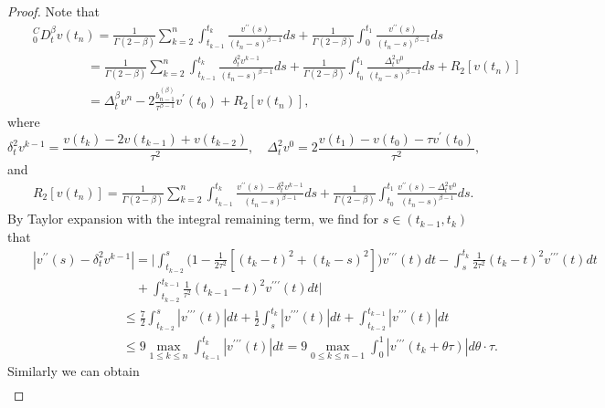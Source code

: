 \documentclass[11pt]{article}
\newenvironment{proofed}{\begin{proof}}{\end{proof}}
\begin{document}
\begin{proofed}
Note that
\begin{eqnarray}
&&_0^CD_t^{\beta}v(t_n)=\frac{1}{\Gamma{(2-\beta)} } \sum_{k=2}^n \int_{t_{k-1}}^{t_k} \frac{v^{\prime\prime}(s)}{(t_n-s)^{\beta-1}}ds +\frac{1}{\Gamma{(2-\beta)} } \int_{0}^{t_1} \frac{v^{\prime\prime}(s)}{(t_n-s)^{\beta-1}}ds\nonumber \\
&&   \qquad \qquad ~ = \frac{1}{\Gamma{(2-\beta)} } \sum_{k=2}^n \int_{t_{k-1}}^{t_k} \frac{\delta_t^2 v^{k-1}}{(t_n-s)^{\beta-1}}ds +\frac{1}{\Gamma{(2-\beta)} } \int_{t_{0}}^{t_1} \frac{\Delta_t^2v^{0}}{(t_n-s)^{\beta-1}}ds+R_2[v(t_n)] \nonumber \\
&&   \qquad \qquad~=\Delta_t^{\beta}v^n- 2  \frac{b_{n-1}^{(\beta)}}{\tau^{\beta-1}}  v^{\prime}(t_0)  +R_2[v(t_n)], \label{split-1}
\end{eqnarray}
where
$$\delta_t^2v^{k-1}=\frac{v(t_k)-2v(t_{k-1})+v(t_{k-2}) }{\tau^2},\quad \Delta_t^2v^{0}=2\frac{v(t_1)-v(t_{0})-\tau v^{\prime}(t_{0}) }{\tau^2},$$
and
\begin{eqnarray}
&&R_2[v(t_n)]= \frac{1}{\Gamma{(2-\beta)} } \sum_{k=2}^n \int_{t_{k-1}}^{t_k} \frac{v^{\prime\prime}(s)-\delta_t^2 v^{k-1}}{(t_n-s)^{\beta-1}}ds  +\frac{1}{\Gamma{(2-\beta)} }  \int_{t_{0}}^{t_1} \frac{v^{\prime\prime}(s)-\Delta_t^2 v^{0}}{(t_n-s)^{\beta-1}}ds. \label{truncation}
\end{eqnarray}
By  Taylor expansion with the integral remaining term,  we find for $s\in(t_{k-1},t_{k})$ that
\begin{eqnarray}
&& |v^{\prime\prime}(s)-\delta_t^2 v^{k-1}| = \biggl|\int^s_{t_{k-2}}\biggl(1-\frac{1}{2\tau^2}[(t_k-t)^2+(t_k-s)^2]\biggl) v^{\prime\prime\prime}(t)dt-\int_s^{t_{k}}\frac{1}{2\tau^2}(t_{k}-t)^2 v^{\prime\prime\prime}(t)dt\nonumber\\
&&\qquad\qquad\qquad\qquad +\int_{t_{k-2}}^{t_{k-1}}\frac{1}{\tau^2}(t_{k-1}-t)^2 v^{\prime\prime\prime}(t)dt \biggl|\nonumber\\
&& \qquad \qquad\qquad\quad \leq \frac{7}{2}\int^s_{t_{k-2}} |v^{\prime\prime\prime}(t)|dt+\frac{1}{2}\int_s^{t_{k}} |v^{\prime\prime\prime}(t)|dt+\int_{t_{k-2}}^{t_{k-1}} |v^{\prime\prime\prime}(t)|dt\nonumber\\
&& \qquad \qquad\qquad\quad \leq 9\max_{1\leq k\leq n}\int_{t_{k-1}}^{t_{k}} |v^{\prime\prime\prime}(t)|dt =9 \max_{0\leq k\leq n-1}\int_{0}^{1}|v^{\prime\prime\prime}(t_{k}+\theta \tau)|d\theta\cdot \tau . \label{truncation-1}
\end{eqnarray}
Similarly we can obtain
\begin{eqnarray}

\end{eqnarray}
\end{proofed}
\end{document}
